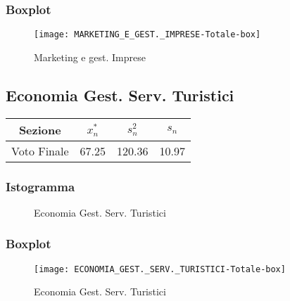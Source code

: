 \subsubsection{Boxplot}
\begin{figure}[!h]
  \centering
  \texttt{[image: MARKETING\_E\_GEST.\_IMPRESE-Totale-box]}
  \caption{Marketing e gest. Imprese}
\end{figure}
\restoregeometry
\clearpage

\thispagestyle{empty} %
\subsection{Economia Gest. Serv. Turistici}

\begin{center}
\begin{tabular}{|c|c|c|c|}
  \hline
  Sezione & \(x_{n}^{*}\) & \(s_n^2\) & \(s_n\) \\
  \hline
  Voto Finale & 67.25 & 120.36 & 10.97 \\
  \hline
\end{tabular}
\end{center}

\subsubsection{Istogramma}
\begin{figure}[!h]
  \caption{Economia Gest. Serv. Turistici}
\end{figure}

\subsubsection{Boxplot}
\begin{figure}[!h]
  \centering
  \texttt{[image: ECONOMIA\_GEST.\_SERV.\_TURISTICI-Totale-box]}
  \caption{Economia Gest. Serv. Turistici}
\end{figure}
\restoregeometry
\clearpage

